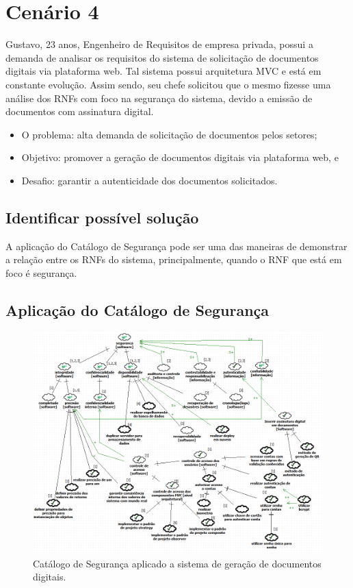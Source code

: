 \section{Cenário 4}
\label{subsec:persona4}

Gustavo, 23 anos, Engenheiro de Requisitos de empresa privada, possui a demanda de analisar os requisitos do sistema de solicitação de documentos digitais via plataforma web. Tal sistema possui arquitetura MVC e está em constante evolução. Assim sendo, seu chefe solicitou que o mesmo fizesse uma análise dos RNFs com foco na segurança do sistema, devido a emissão de documentos com assinatura digital. 

\begin{itemize}
	\item O problema: alta demanda de solicitação de documentos pelos setores; 
	\item Objetivo: promover a geração de documentos digitais via plataforma web, e
	\item Desafio: garantir a autenticidade dos documentos solicitados.
\end{itemize}

\subsection{Identificar possível solução}

A aplicação do Catálogo de Segurança pode ser uma das maneiras de demonstrar a relação entre os RNFs do sistema, principalmente, quando o RNF que está em foco é segurança.


\subsection{Aplicação do Catálogo de Segurança}

\begin{figure}[h!]
	\centering
	\includegraphics[keepaspectratio=true,scale=0.8]{figuras/catalogoPersona4.PNG}
	\caption{Catálogo de Segurança aplicado a sistema de geração de documentos digitais.}
	\label{catalogoPersona4}
\end{figure}

